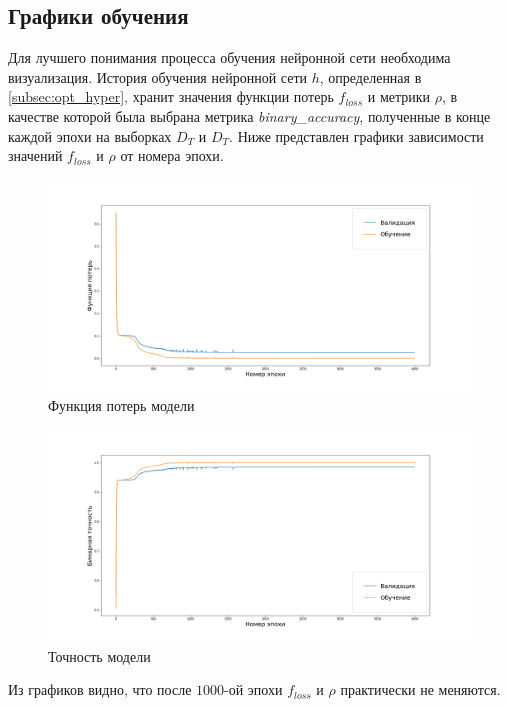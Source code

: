 \subsection{Графики обучения}\label{subsec:learning_figures}

Для лучшего понимания процесса обучения нейронной сети необходима визуализация. История обучения нейронной сети $h$, определенная в \ref{subsec:opt_hyper}, хранит значения функции потерь $f_{loss}$  и метрики $\rho$, в качестве которой была выбрана метрика \textsl{binary\_accuracy}\cite[раздел metrics]{bib:keras}, полученные в конце каждой эпохи на выборках $D_T$ и $D_T$. Ниже представлен графики зависимости значений $f_{loss}$ и $\rho$ от номера эпохи.

\begin{figure}[h]
    \centering
    \includegraphics[scale=0.45]{model_loss}
    \caption{Функция потерь модели}
    \label{fig:loss}
\end{figure}

\newpage

\begin{figure}[h]
    \centering
    \includegraphics[scale=0.45]{model_binary_accuracy}
    \caption{Точность модели}
    \label{fig:accuracy}
\end{figure}


Из графиков видно, что после $1000$-ой эпохи $f_{loss}$ и $\rho$ практически не меняются.
